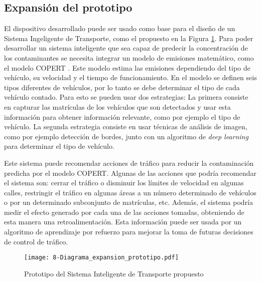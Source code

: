 \subsection{Expansión del prototipo}
El dispositivo desarrollado puede ser usado como base para el diseño de un Sistema Ingeligente de Transporte, como el propuesto en la Figura \ref{fig:8-Diagrama_expansión_prototipo}. Para poder desarrollar un sistema inteligente que sea capaz de predecir la concentración de los contaminantes se necesita integrar un modelo de emisiones matemático, como el modelo COPERT \cite{NS16}. Este modelo estima las emisiones dependiendo del tipo de vehículo, su velocidad y el tiempo de funcionamiento. En el modelo se definen seis tipos diferentes de vehículos, por lo tanto se debe determinar el tipo de cada vehículo contado. Para esto se pueden usar dos estrategias: La primera consiste en capturar las matrículas de los vehículos que son detectados y usar esta información para obtener información relevante, como por ejemplo el tipo de vehículo. La segunda estrategia consiste en usar técnicas de análisis de imagen, como por ejemplo detección de bordes, junto con un algoritmo de \textit{deep learning} para determinar el tipo de vehículo.

Este sistema puede recomendar acciones de tráfico para reducir la contaminación predicha por el modelo COPERT. Algunas de las acciones que podría  recomendar el sistema son: cerrar el tráfico o disminuir los límites de velocidad en algunas calles, restringir el tráfico en algunas áreas a un número determinado de vehículos o por un determinado subconjunto de matrículas, etc. Además, el sistema podría medir el efecto generado por cada una de las acciones tomadas, obteniendo de esta manera una retroalimentación. Esta información puede ser usada por un algoritmo de aprendizaje por refuerzo para mejorar la toma de futuras decisiones de control de tráfico.

\begin{figure}[!h]
	\begin{center}
		\texttt{[image: 8-Diagrama\_expansion\_prototipo.pdf]}
		\caption{Prototipo del Sistema Inteligente de Transporte propuesto}
		\label{fig:8-Diagrama_expansión_prototipo}
	\end{center}
\end{figure}


